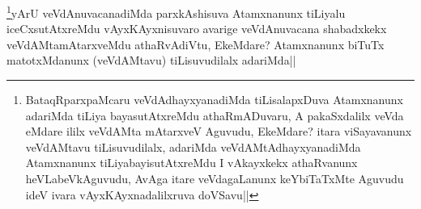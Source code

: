 \begin{artha}
\footnote{BataqRparxpaMcaru veVdAdhayxyanadiMda tiLisalapxDuva Atamxnanunx adariMda tiLiya bayasutAtxreMdu athaRmADuvaru, A pakaSxdalilx veVda eMdare ililx veVdAMta mAtarxveV Aguvudu, EkeMdare? itara viSayavanunx veVdAMtavu tiLisuvudilalx, adariMda veVdAMtAdhayxyanadiMda Atamxnanunx tiLiyabayisutAtxreMdu I vAkayxkekx athaRvanunx heVLabeVkAguvudu, AvAga itare veVdagaLanunx keYbiTaTxMte Aguvudu ideV ivara vAyxKAyxnadalilxruva doVSavu||}yArU veVdAnuvacanadiMda parxkAshisuva Atamxnanunx tiLiyalu iceCxsutAtxreMdu vAyxKAyxnisuvaro avarige veVdAnuvacana shabadxkekx veVdAMtamAtarxveMdu athaRvAdiVtu, EkeMdare? Atamxnanunx biTuTx matotxMdanunx (veVdAMtavu) tiLisuvudilalx adariMda||
\end{artha}
